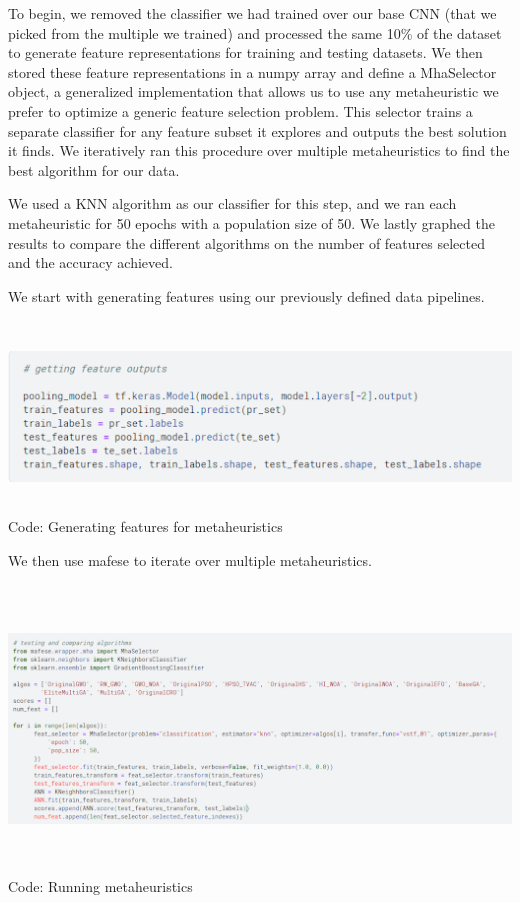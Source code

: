 To begin, we removed the classifier we had trained over our base CNN (that we picked from the multiple we trained) and processed the same 10\% of the dataset to generate feature representations for training and testing datasets. We then stored these feature representations in a numpy array and define a MhaSelector object, a generalized implementation that allows us to use any metaheuristic we prefer to optimize a generic feature selection problem. This selector trains a separate classifier for any feature subset it explores and outputs the best solution it finds. We iteratively ran this procedure over multiple metaheuristics to find the best algorithm for our data. 

We used a KNN algorithm as our classifier for this step, and we ran each metaheuristic for 50 epochs with a population size of 50. We lastly graphed the results to compare the different algorithms on the number of features selected and the accuracy achieved. 

We start with generating features using our previously defined data pipelines.

\begin{center}
   \includegraphics[width=6in,height=2in]{images/c7.png} 
   \\\fontsize{11pt}{24pt} Code: Generating features for metaheuristics
\end{center}

	
 
We then use mafese to iterate over multiple metaheuristics.


\begin{center}
   \includegraphics[width=6in,height=3in]{images/c8.png} 
   \\\fontsize{11pt}{24pt} Code: Running metaheuristics
\end{center}

